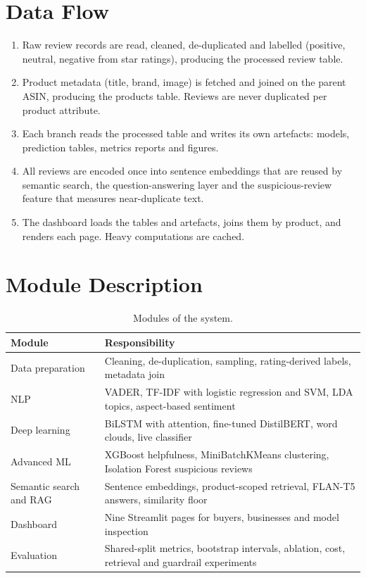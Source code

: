 \documentclass[12pt,a4paper]{report}
\begin{document}
\section{Data Flow}
\begin{enumerate}
\item Raw review records are read, cleaned, de-duplicated and labelled (positive, neutral, negative from star ratings), producing the processed review table.
\item Product metadata (title, brand, image) is fetched and joined on the parent ASIN, producing the products table. Reviews are never duplicated per product attribute.
\item Each branch reads the processed table and writes its own artefacts: models, prediction tables, metrics reports and figures.
\item All reviews are encoded once into sentence embeddings that are reused by semantic search, the question-answering layer and the suspicious-review feature that measures near-duplicate text.
\item The dashboard loads the tables and artefacts, joins them by product, and renders each page. Heavy computations are cached.
\end{enumerate}

\section{Module Description}
\begin{table}[htbp]
\centering
\caption{Modules of the system.}
\small
\begin{tabularx}{\textwidth}{@{}>{\raggedright\arraybackslash}p{3.6cm}X@{}}
\toprule
Module & Responsibility \\
\midrule
Data preparation & Cleaning, de-duplication, sampling, rating-derived labels, metadata join \\
NLP & VADER, TF-IDF with logistic regression and SVM, LDA topics, aspect-based sentiment \\
Deep learning & BiLSTM with attention, fine-tuned DistilBERT, word clouds, live classifier \\
Advanced ML & XGBoost helpfulness, MiniBatchKMeans clustering, Isolation Forest suspicious reviews \\
Semantic search and RAG & Sentence embeddings, product-scoped retrieval, FLAN-T5 answers, similarity floor \\
Dashboard & Nine Streamlit pages for buyers, businesses and model inspection \\
Evaluation & Shared-split metrics, bootstrap intervals, ablation, cost, retrieval and guardrail experiments \\
\bottomrule
\end{tabularx}
\end{table}
\end{document}
